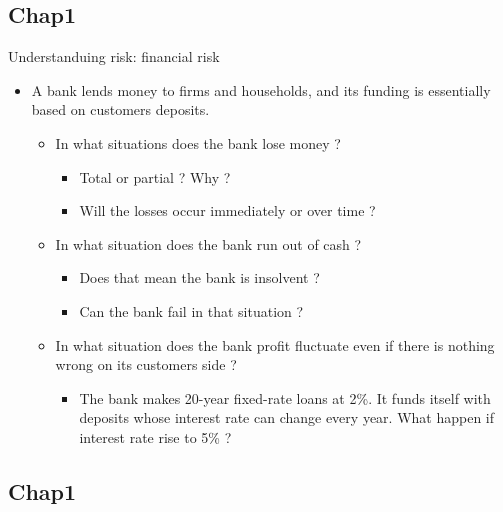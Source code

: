 \documentclass[aspectratio=169, 10pt]{beamer} %
\begin{document}
\subsection{Chap1}
\begin{frame}{Understanduing risk: financial risk}


    \begin{itemize}

                 \item [$\bullet$] A bank lends money to firms and households, and its funding is essentially based on customers deposits.  
                 \begin{itemize}
        \item [$\bullet$] In what situations does the bank lose money ?
        \begin{itemize}
            \item[$\bullet$]  Total or partial ? Why ? 
            \item[$\bullet$]  Will the losses occur immediately or over time ? 
        \end{itemize} 
          \medskip 
          \item [$\bullet$] In what situation does the bank run out of cash ? 
           \begin{itemize}
            \item[$\bullet$] Does that mean the bank is insolvent ?  
            \item[$\bullet$] Can the bank fail in that situation ? 
        \end{itemize} 
           \medskip 
          \item [$\bullet$] In what situation does the bank profit fluctuate even if there is nothing wrong on its customers side ? 
          \begin{itemize}
            \item [$\bullet$] The bank makes 20-year fixed-rate loans at 2\%. It funds itself with deposits whose interest rate can change every year.
What happen if interest rate rise to 5\% ? 
        \end{itemize} 
    \end{itemize}
    \end{itemize}
\end{frame}

\subsection{Chap1}
\end{document}

